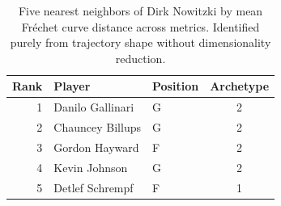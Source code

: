 \begin{table}[htbp]
  \centering\small
  \begin{tabular}{rllc}
    \toprule
    Rank & Player & Position & Archetype \\
    \midrule
    1 & Danilo Gallinari & G & 2 \\
    2 & Chauncey Billups & G & 2 \\
    3 & Gordon Hayward & F & 2 \\
    4 & Kevin Johnson & G & 2 \\
    5 & Detlef Schrempf & F & 1 \\
    \bottomrule
  \end{tabular}
  \caption{Five nearest neighbors of Dirk Nowitzki by mean Fr\'{e}chet curve distance across metrics. Identified purely from trajectory shape without dimensionality reduction.}
  \label{tab:Dirk_Nowitzki_frechet_curve_neighbors}
\end{table}

